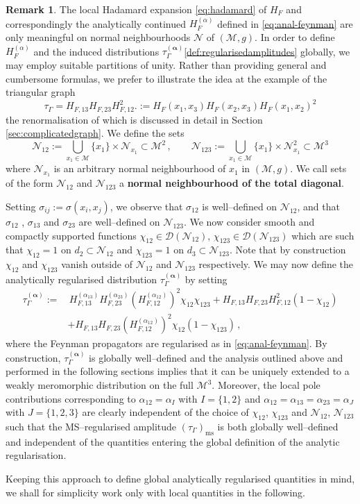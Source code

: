 \documentclass[a4paper,10pt,twoside]{article}
\numberwithin{equation}{section}
\newcounter{and}
\def\M{\mathcal{M}}
\def\N{\mathcal{N}}
\def\D{\mathcal{D}}
\def\ms{\mathrm{ms}}
\def\balpha{{\boldsymbol{\alpha}}}
\theoremstyle{plain}
\theoremstyle{definition}
\newtheorem{rem}[theo]{Remark}
\begin{document}
\begin{rem}\label{rem:geodesicneighbourhood}
The local Hadamard expansion  \eqref{eq:hadamard} of $H_F$ and correspondingly the analytically continued $H^{(\alpha)}_F$ defined in \eqref{eq:anal-feynman} are only meaningful on normal neighbourhoods $\N$ of $(\M,g)$. In order to define $H^{(\alpha)}_F$ and the induced distributions $\tau^{(\balpha)}_\Gamma$\eqref{def:regularisedamplitudes} globally, we may employ suitable partitions of unity. Rather than providing general and cumbersome formulas, we prefer to illustrate the idea at the example of the triangular graph
%
$$\tau_\Gamma=H_{F,13}H_{F,23}H_{F,12}^2.:=H_{F}(x_1,x_3)H_{F}(x_2,x_3)H_{F}(x_1,x_2)^2$$
%
the renormalisation of which is discussed in detail in Section \ref{sec:complicatedgraph}. We define the sets 
%
$$\N_{12}:=\bigcup_{x_1\in\M}\{x_1\}\times \N_{x_1}\subset \M^2\,,\qquad \N_{123}:=\bigcup_{x_1\in\M}\{x_1\}\times \N_{x_1}^2\subset \M^3$$
%
where $\N_{x_1}$ is an arbitrary normal neighbourhood of $x_1$ in $(\M,g)$. We call sets of the form $\N_{12}$ and $\N_{123}$ a {\bf normal neighbourhood of the total diagonal}.

Setting $\sigma_{ij}:=\sigma(x_i,x_j)$, we observe that $\sigma_{12}$ is well--defined on $\N_{12}$, and that $\sigma_{12}$ , $\sigma_{13}$ and $\sigma_{23}$ are well--defined on $\N_{123}$. We now consider smooth and compactly supported functions $\chi_{12}\in\D(\N_{12})$, $\chi_{123}\in\D(\N_{123})$ which are such that $\chi_{12}=1$ on $d_2\subset \N_{12}$ and $\chi_{123}=1$ on $d_3\subset \N_{123}$. Note that by construction $\chi_{12}$ and $\chi_{123}$ vanish outside of $\N_{12}$ and $\N_{123}$ respectively. We may now define the analytically regularised distribution $\tau^{(\balpha)}_\Gamma$ by setting
%
\begin{align*}\tau^{(\balpha)}_\Gamma:=&\,H^{(\alpha_{13})}_{F,13}H^{(\alpha_{23})}_{F,23}\left(H^{(\alpha_{12})}_{F,12}\right)^2\chi_{12}\chi_{123} + H_{F,13}H_{F,23}H_{F,12}^2(1-\chi_{12})\\&+H_{F,13}H_{F,23}\left(H^{(\alpha_{12})}_{F,12}\right)^2\chi_{12}(1-\chi_{123})\,,
\end{align*}
%
where the Feynman propagators are regularised as in \eqref{eq:anal-feynman}. By construction, $\tau^{(\balpha)}_\Gamma$ is globally well--defined and the analysis outlined above and performed in the following sections implies that it can be uniquely extended to a weakly meromorphic distribution on the full $\M^3$. Moreover, the local pole contributions corresponding to $\alpha_{12}=\alpha_I$ with $I=\{1,2\}$ and $\alpha_{12}=\alpha_{13}=\alpha_{23}=\alpha_J$ with $J=\{1,2,3\}$ are clearly independent of the choice of $\chi_{12}$, $\chi_{123}$ and $\N_{12}$, $\N_{123}$ such that the MS--regularised amplitude $(\tau_\Gamma)_\ms$ is both globally well--defined and independent of the quantities entering the global definition of the analytic regularisation.

Keeping this approach to define global analytically regularised quantities in mind, we shall for simplicity work only with local quantities in the following.
\end{rem}
\end{document}

